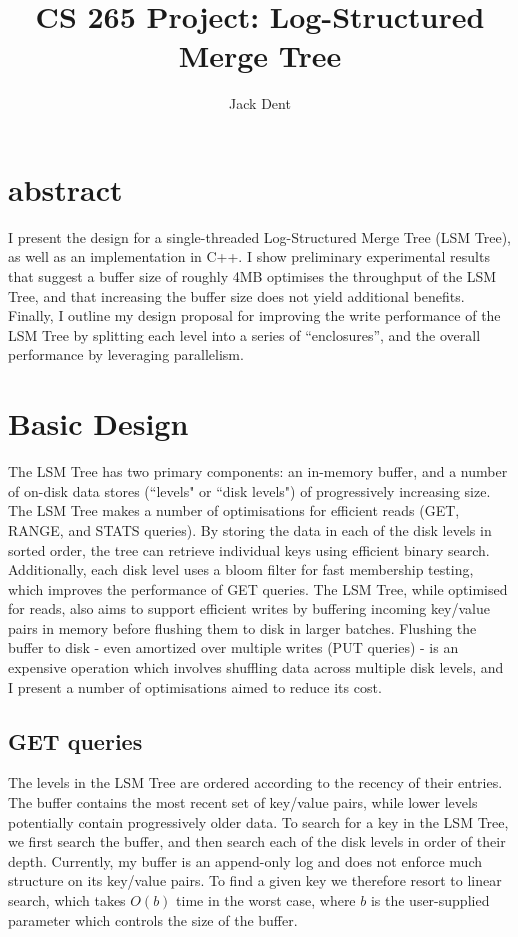 \documentclass[format=acmtog, review=false]{acmart}
\begin{document}
\title{CS 265 Project: Log-Structured Merge Tree}
\author{Jack Dent}
\maketitle

\section{abstract}
I present the design for a single-threaded Log-Structured Merge Tree (LSM Tree), as well as an implementation in C++. I show preliminary experimental results that suggest a buffer size of roughly 4MB optimises the throughput of the LSM Tree, and that increasing the buffer size does not yield additional benefits. Finally, I outline my design proposal for improving the write performance of the LSM Tree by splitting each level into a series of ``enclosures'', and the overall performance by leveraging parallelism.

\section{Basic Design}

The LSM Tree has two primary components: an in-memory buffer, and a number of on-disk data stores (``levels" or ``disk levels") of progressively increasing size. The LSM Tree makes a number of optimisations for efficient reads (GET, RANGE, and STATS queries). By storing the data in each of the disk levels in sorted order, the tree can retrieve individual keys using efficient binary search. Additionally, each disk level uses a bloom filter for fast membership testing, which improves the performance of GET queries. The LSM Tree, while optimised for reads, also aims to support efficient writes by buffering incoming key/value pairs in memory before flushing them to disk in larger batches. Flushing the buffer to disk - even amortized over multiple writes (PUT queries) - is an expensive operation which involves shuffling data across multiple disk levels, and I present a number of optimisations aimed to reduce its cost.

\subsection{GET queries}

The levels in the LSM Tree are ordered according to the recency of their entries. The buffer contains the most recent set of key/value pairs, while lower levels potentially contain progressively older data. To search for a key in the LSM Tree, we first search the buffer, and then search each of the disk levels in order of their depth. Currently, my buffer is an append-only log and does not enforce much structure on its key/value pairs. To find a given key we therefore resort to linear search, which takes $O(b)$ time in the worst case, where $b$ is the user-supplied parameter which controls the size of the buffer.
\end{document}
